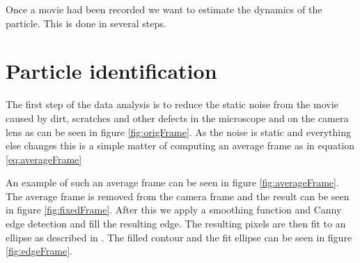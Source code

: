 Once a movie had been recorded we want to estimate the dynamics of the particle. This is done in several steps. 

\section{Particle identification}\label{sec:particleidentification}

The first step of the data analysis is to reduce the static noise from the movie caused by dirt, scratches and other defects in the microscope and on the camera lens as can be seen in figure \ref{fig:origFrame}. As the noise is static and everything else changes this is a simple matter of computing an average frame as in equation \ref{eq:averageFrame}

An example of such an average frame can be seen in figure \ref{fig:averageFrame}. The average frame is removed from the camera frame and the result can be seen in figure \ref{fig:fixedFrame}. After this we apply a smoothing function and Canny edge detection \cite{Canny} and fill the resulting edge. The resulting pixels are then fit to an ellipse as 
described in \cite{AntonThesis, EllipseFit}. The filled contour and the fit ellipse can be seen in figure 
\ref{fig:edgeFrame}.

